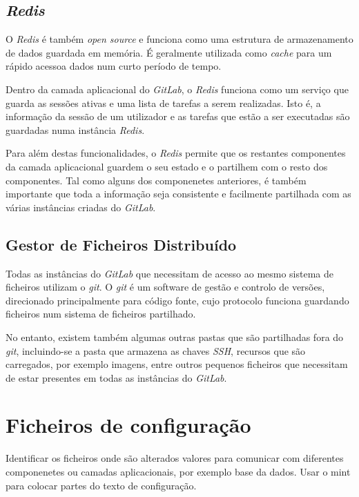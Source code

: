 \documentclass[12pt,a4paper]{article}
\begin{document}
\subsection{\emph{Redis}}
O \emph{Redis} é também \emph{open source} e funciona como uma estrutura de armazenamento de dados guardada em memória. É geralmente utilizada como \emph{cache} para um rápido acessoa dados num curto período de tempo.

Dentro da camada aplicacional do \emph{GitLab}, o \emph{Redis} funciona como um serviço que guarda as sessões ativas e uma lista de tarefas a serem realizadas. Isto é, a informação da sessão de um utilizador e as tarefas que estão a ser executadas são guardadas numa instância \emph{Redis}.

Para além destas funcionalidades, o \emph{Redis} permite que os restantes componentes da camada aplicacional guardem o seu estado e o partilhem com o resto dos componentes. Tal como alguns dos componenetes anteriores, é também importante que toda a informação seja consistente e facilmente partilhada com as várias instâncias criadas do \emph{GitLab}.


\subsection{Gestor de Ficheiros Distribuído}
Todas as instâncias do \emph{GitLab} que necessitam de acesso ao mesmo sistema de ficheiros utilizam o \emph{git}. O \emph{git} é um software de gestão e controlo de versões, direcionado principalmente para código fonte, cujo protocolo funciona guardando ficheiros num sistema de ficheiros partilhado.

No entanto, existem também algumas outras pastas que são partilhadas fora do \emph{git}, incluindo-se a pasta que armazena as chaves \emph{SSH}, recursos que são carregados, por exemplo imagens, entre outros pequenos ficheiros que necessitam de estar presentes em todas as instâncias do \emph{GitLab}.








\newpage
\section{Ficheiros de configuração}

Identificar os ficheiros onde são alterados valores para comunicar com diferentes componenetes ou camadas aplicacionais, por exemplo base da dados.
Usar o mint para colocar partes do texto de configuração.
\end{document}
